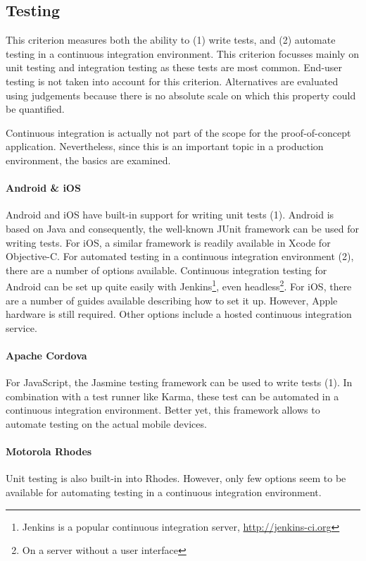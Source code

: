 \subsection{Testing}

This criterion measures both the ability to (1) write tests, and (2) automate testing in a continuous integration environment. This criterion focusses mainly on unit testing and integration testing as these tests are most common. End-user testing is not taken into account for this criterion. Alternatives are evaluated using judgements because there is no absolute scale on which this property could be quantified. 

Continuous integration is actually not part of the scope for the proof-of-concept application. Nevertheless, since this is an important topic in a production environment, the basics are examined.

\paragraph{Android \& iOS} Android and iOS have built-in support for writing unit tests (1). Android is based on Java and consequently, the well-known JUnit framework can be used for writing tests. For iOS, a similar framework is readily available in Xcode for Objective-C. For automated testing in a continuous integration environment (2), there are a number of options available. Continuous integration testing for Android can be set up quite easily with Jenkins\footnote{Jenkins is a popular continuous integration server, \url{http://jenkins-ci.org}}, even headless\footnote{On a server without a user interface}. For iOS, there are a number of guides available describing how to set it up. However, Apple hardware is still required. Other options include a hosted continuous integration service.

\paragraph{Apache Cordova} For JavaScript, the Jasmine testing framework can be used to write tests (1). In combination with a test runner like Karma, these test can be automated in a continuous integration environment. Better yet, this framework allows to automate testing on the actual mobile devices.

\paragraph{Motorola Rhodes} Unit testing is also built-in into Rhodes. However, only few options seem to be available for automating testing in a continuous integration environment.

